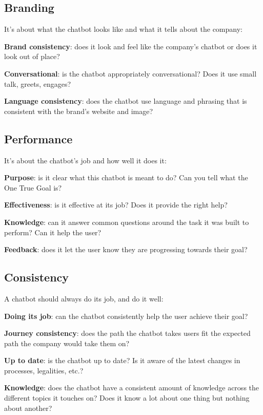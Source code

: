 \documentclass{article}
\begin{document}
\subsection{Branding}
It’s about what the chatbot looks like and what it tells about the company:
\begin{description}
    \item \textbf{Brand consistency}: does it look and feel like the company's chatbot or does it look out of place?
 \item \textbf{Conversational}: is the chatbot appropriately conversational? Does it use small talk, greets, engages?
    \item \textbf{Language consistency}: does the chatbot use language and phrasing that is consistent with the brand's website and image?
\end{description}

\subsection{Performance}
It’s about the chatbot’s job and how well it does it:
\begin{description}
    \item \textbf{Purpose}: is it clear what this chatbot is meant to do? Can you tell what the One True Goal is?
    \item \textbf{Effectiveness}: is it effective at its job? Does it provide the right help?
    \item \textbf{Knowledge}: can it answer common questions around the task it was built to perform? Can it help the user?
    \item \textbf{Feedback}: does it let the user know they are progressing towards their goal?
\end{description}

\subsection{Consistency}
A chatbot should always do its job, and do it well:
\begin{description}
    \item \textbf{Doing its job}: can the chatbot consistently help the user achieve their goal?
    \item \textbf{Journey consistency}: does the path the chatbot takes users fit the expected path the company would take them on?
    \item \textbf{Up to date}: is the chatbot up to date? Is it aware of the latest changes in processes, legalities, etc.?
    \item \textbf{Knowledge}: does the chatbot have a consistent amount of knowledge across the different topics it touches on? Does it know a lot about one thing but nothing about another?
\end{description}
\end{document}
